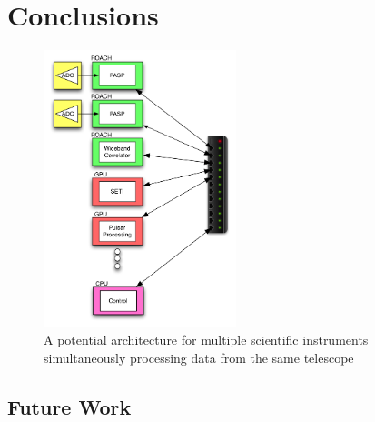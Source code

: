 \chapter{Conclusions}
\label{chap:Conclusions}


\begin{figure}[ht!]
  \centering
    \includegraphics[width=0.5\textwidth]{Images/C5/universal_arch.png}
  \caption{A potential architecture for multiple scientific instruments simultaneously processing data from the same telescope}
  \label{fig: C5/universal_arch.png}
\end{figure}

\section{Future Work}





